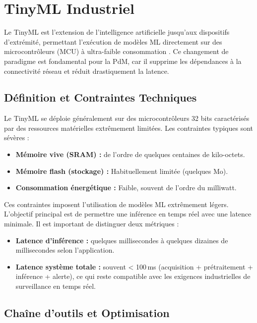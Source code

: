 \section{TinyML Industriel}
\label{sec:tinyml_industriel}

Le TinyML est l'extension de l'intelligence artificielle jusqu'aux dispositifs d'extrémité, permettant l'exécution de modèles ML directement sur des microcontrôleurs (MCU) à ultra-faible consommation \cite{tsoukas2024,njor2024}. Ce changement de paradigme est fondamental pour la PdM, car il supprime les dépendances à la connectivité réseau et réduit drastiquement la latence.

\subsection{Définition et Contraintes Techniques}

Le TinyML se déploie généralement sur des microcontrôleurs 32 bits caractérisés par des ressources matérielles extrêmement limitées. Les contraintes typiques sont sévères :
\begin{itemize}
\item \textbf{Mémoire vive (SRAM) :} de l'ordre de quelques centaines de kilo-octets.
\item \textbf{Mémoire flash (stockage) :} Habituellement limitée (quelques Mo).
\item \textbf{Consommation énergétique :} Faible, souvent de l'ordre du milliwatt.
\end{itemize}

Ces contraintes imposent l'utilisation de modèles ML extrêmement légers. L'objectif principal est de permettre une inférence en temps réel avec une latence minimale. Il est important de distinguer deux métriques :
\begin{itemize}
\item \textbf{Latence d'inférence :} quelques millisecondes à quelques dizaines de millisecondes selon l'application.
\item \textbf{Latence système totale :} souvent < 100\,ms (acquisition + prétraitement + inférence + alerte), ce qui reste compatible avec les exigences industrielles de surveillance en temps réel.
\end{itemize}

\subsection{Chaîne d'outils et Optimisation}

